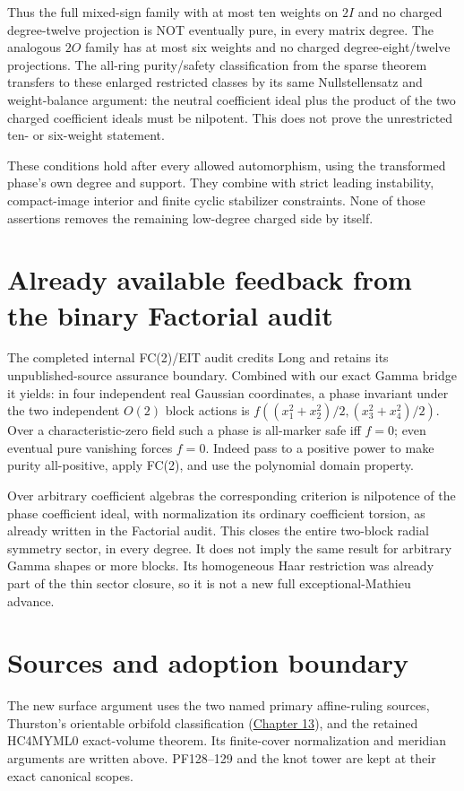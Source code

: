 \documentclass[11pt]{article}
\begin{document}
Thus the full mixed-sign family with at most ten weights on $2I$ and
no charged degree-twelve projection is NOT eventually pure, in every
matrix degree. The analogous $2O$ family has at most six weights and
no charged degree-eight/twelve projections. The all-ring purity/safety
classification from the sparse theorem transfers to these enlarged
restricted classes by its same Nullstellensatz and weight-balance
argument: the neutral coefficient ideal plus the product of the two
charged coefficient ideals must be nilpotent. This does not prove the
unrestricted ten- or six-weight statement.

These conditions hold after every allowed automorphism, using the
transformed phase's own degree and support. They combine with strict
leading instability, compact-image interior and finite cyclic stabilizer
constraints. None of those assertions removes the remaining low-degree
charged side by itself.

\section{Already available feedback from the binary Factorial audit}

The completed internal FC(2)/EIT audit credits Long and retains its
unpublished-source assurance boundary. Combined with our exact Gamma
bridge it yields: in four independent real Gaussian coordinates,
a phase invariant under the two independent $O(2)$ block actions is
$f((x_1^2+x_2^2)/2,(x_3^2+x_4^2)/2)$.
Over a characteristic-zero field such a phase is all-marker safe iff
$f=0$; even eventual pure vanishing forces $f=0$.
Indeed pass to a positive power to make purity all-positive, apply
FC(2), and use the polynomial domain property.

Over arbitrary coefficient algebras the corresponding criterion is
nilpotence of the phase coefficient ideal, with normalization its ordinary
coefficient torsion, as already written in the Factorial audit.
This closes the entire two-block radial symmetry sector, in every degree.
It does not imply the same result for arbitrary Gamma shapes or more
blocks. Its homogeneous Haar restriction was already part of the thin
sector closure, so it is not a new full exceptional-Mathieu advance.

\section{Sources and adoption boundary}

The new surface argument uses the two named primary affine-ruling sources,
Thurston's orientable orbifold classification
(\href{https://people.math.osu.edu/davis.12/courses/8800/Thurston13.pdf}{Chapter 13}),
and the retained HC4MYML0 exact-volume theorem.
Its finite-cover normalization and meridian arguments are written above.
PF128--129 and the knot tower are kept at their exact canonical scopes.
\end{document}
